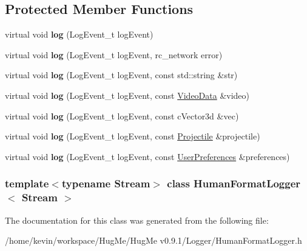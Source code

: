 \subsection*{Protected Member Functions}
\begin{DoxyCompactItemize}
\item 
\hypertarget{classHumanFormatLogger_a36ded631f6095de7b0cb96ec2af0944c}{
virtual void {\bfseries log} (LogEvent\_\-t logEvent)}
\label{classHumanFormatLogger_a36ded631f6095de7b0cb96ec2af0944c}

\item 
\hypertarget{classHumanFormatLogger_a2e419cfe25dbf748ee6b0eb2141f65fc}{
virtual void {\bfseries log} (LogEvent\_\-t logEvent, rc\_\-network error)}
\label{classHumanFormatLogger_a2e419cfe25dbf748ee6b0eb2141f65fc}

\item 
\hypertarget{classHumanFormatLogger_adce37538632ef3b2eb7527e49a31d818}{
virtual void {\bfseries log} (LogEvent\_\-t logEvent, const std::string \&str)}
\label{classHumanFormatLogger_adce37538632ef3b2eb7527e49a31d818}

\item 
\hypertarget{classHumanFormatLogger_a69901184b8637645606705513f7dbc3e}{
virtual void {\bfseries log} (LogEvent\_\-t logEvent, const \hyperlink{structVideoData}{VideoData} \&video)}
\label{classHumanFormatLogger_a69901184b8637645606705513f7dbc3e}

\item 
\hypertarget{classHumanFormatLogger_ace0b4baa6c6999ca4111e4bc443e6b4a}{
virtual void {\bfseries log} (LogEvent\_\-t logEvent, const cVector3d \&vec)}
\label{classHumanFormatLogger_ace0b4baa6c6999ca4111e4bc443e6b4a}

\item 
\hypertarget{classHumanFormatLogger_a84e429003498dc59385e7e4dfd4dee64}{
virtual void {\bfseries log} (LogEvent\_\-t logEvent, const \hyperlink{classProjectile}{Projectile} \&projectile)}
\label{classHumanFormatLogger_a84e429003498dc59385e7e4dfd4dee64}

\item 
\hypertarget{classHumanFormatLogger_a3ef78598907255bd9a467932f523d2fb}{
virtual void {\bfseries log} (LogEvent\_\-t logEvent, const \hyperlink{structUserPreferences}{UserPreferences} \&preferences)}
\label{classHumanFormatLogger_a3ef78598907255bd9a467932f523d2fb}

\end{DoxyCompactItemize}
\subsubsection*{template$<$typename Stream$>$ class HumanFormatLogger$<$ Stream $>$}



The documentation for this class was generated from the following file:\begin{DoxyCompactItemize}
\item 
/home/kevin/workspace/HugMe/HugMe v0.9.1/Logger/HumanFormatLogger.h\end{DoxyCompactItemize}
